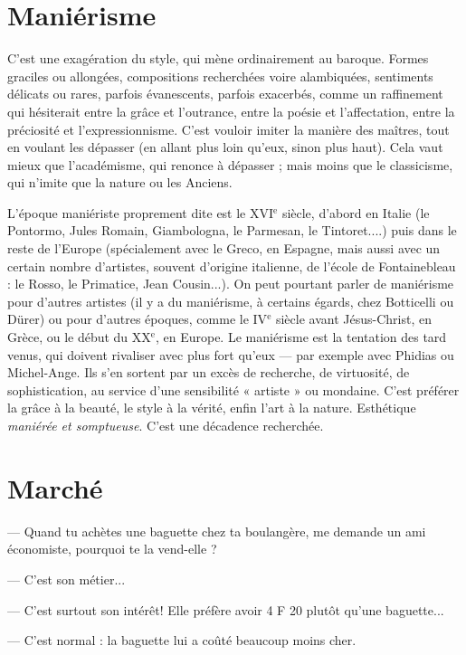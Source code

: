 \section{Maniérisme}
C'est une exagération du style, qui mène ordinairement au
baroque. Formes graciles ou allongées, compositions recherchées
voire alambiquées, sentiments délicats ou rares, parfois évanescents, parfois
exacerbés, comme un raffinement qui hésiterait entre la grâce et l’outrance,
entre la poésie et l’affectation, entre la préciosité et l’expressionnisme. C’est
vouloir imiter la manière des maîtres, tout en voulant les dépasser (en allant
plus loin qu’eux, sinon plus haut). Cela vaut mieux que l’académisme, qui
renonce à dépasser ; mais moins que le classicisme, qui n’imite que la nature ou
les Anciens.

L'époque maniériste proprement dite est le {\footnotesize XVI$^\text{e}$} siècle, d’abord en Italie (le
Pontormo, Jules Romain, Giambologna, le Parmesan, le Tintoret....) puis dans
le reste de l'Europe (spécialement avec le Greco, en Espagne, mais aussi avec un
certain nombre d'artistes, souvent d’origine italienne, de l’école de
Fontainebleau : le Rosso, le Primatice, Jean Cousin...). On peut pourtant
parler de maniérisme pour d’autres artistes (il y a du maniérisme, à certains
égards, chez Botticelli ou Dürer) ou pour d’autres époques, comme le {\footnotesize IV$^\text{e}$} siècle
avant Jésus-Christ, en Grèce, ou le début du {\footnotesize XX$^\text{e}$}, en Europe. Le maniérisme est
la tentation des tard venus, qui doivent rivaliser avec plus fort qu'eux — par
exemple avec Phidias ou Michel-Ange. Ils s’en sortent par un excès de
recherche, de virtuosité, de sophistication, au service d’une sensibilité « artiste »
ou mondaine. C’est préférer la grâce à la beauté, le style à la vérité, enfin l’art à
la nature. Esthétique {\it maniérée et somptueuse}. C’est une décadence recherchée.

\section{Marché}
— Quand tu achètes une baguette chez ta boulangère, me
demande un ami économiste, pourquoi te la vend-elle ?

— C’est son métier...

— C’est surtout son intérêt! Elle préfère avoir 4 F 20 plutôt qu’une
baguette...

— C’est normal : la baguette lui a coûté beaucoup moins cher.

